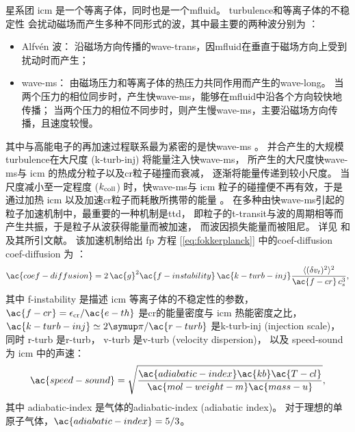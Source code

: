 星系团 \ac{icm} 是一个等离子体，同时也是一个\ac{mfluid}。
\ac{turbulence}和等离子体的不稳定性 \cite{schekochihin2005}
会扰动磁场而产生多种不同形式的波，其中最主要的两种波分别为 \cite{cho2003}：
\begin{itemize}
  \item Alfvén 波：
    沿磁场方向传播的\ac{wave-trans}，因\ac{mfluid}在垂直于磁场方向上受到扰动时而产生；
  \item \ac{wave-ms}：
    由磁场压力和等离子体的热压力共同作用而产生的\ac{wave-long}。
    当两个压力的相位同步时，产生快\ac{wave-ms}，能够在\ac{mfluid}中沿各个方向较快地传播；
    当两个压力的相位不同步时，则产生慢\ac{wave-ms}，主要沿磁场方向传播，且速度较慢。
\end{itemize}
其中与高能电子的再加速过程联系最为紧密的是快\ac{wave-ms}
\cite{brunetti2007,brunetti2011mhd}。
并合产生的大规模\ac{turbulence}在大尺度 (\ac{k-turb-inj}) 将能量注入快\ac{wave-ms}，
所产生的大尺度快\ac{wave-ms}与 \ac{icm} 的热成分粒子以及\ac{cr}粒子碰撞而衰减，
逐渐将能量传递到较小尺度。
当尺度减小至一定程度 ($k_{\mathrm{coll}}$) 时，快\ac{wave-ms}与 \ac{icm}
粒子的碰撞便不再有效，于是通过加热 \ac{icm} 以及加速\ac{cr}粒子而耗散所携带的能量
\cite{brunetti2007,brunetti2011}。
在多种由快\ac{wave-ms}引起的粒子加速机制中，最重要的一种机制是\ac{ttd}，
即粒子的\ac{t-transit}与波的周期相等而产生共振，于是粒子从波获得能量而被加速，
而波因损失能量而被阻尼。
详见  和  及其所引文献。
该加速机制给出 \ac{fp} 方程 [\autoref{eq:fokkerplanck}]
中的\acl{coef-diffusion} \ac{coef-diffusion} 为
\cite{miniati2015,pinzke2017}：
\begin{equation}
  \label{eq:coef-diffusion}
  \ac{coef-diffusion}
    = 2\,\ac{g}^2 \ac{f-instability} \,\ac{k-turb-inj}
      \frac{\langle (\delta v_t)^2 \rangle^2}{\ac{f-cr} \, c_s^3} ,
\end{equation}
其中
\ac{f-instability} 是描述 \ac{icm} 等离子体的不稳定性的参数，
$\ac{f-cr} = \epsilon_{\R{cr}} / \ac{e-th}$
是\ac{cr}的能量密度与 \ac{icm} 热能密度之比，
$\ac{k-turb-inj} \simeq 2\Cpi / \ac{r-turb}$
是\acl{k-turb-inj} (injection scale)，
同时 \ac{r-turb} 是\acl{r-turb}，
\ac{v-turb} 是\acl{v-turb} (velocity dispersion)，
以及 \ac{speed-sound} 为 \ac{icm} 中的声速：
\begin{equation}
  \ac{speed-sound}
    = \sqrt{\frac{\ac{adiabatic-index} \ac{kb} \ac{T-cl}}{
        \ac{mol-weight-m} \ac{mass-u}}} ,
\end{equation}
其中 \ac{adiabatic-index} 是气体的\acl{adiabatic-index} (adiabatic index)。
对于理想的单原子气体，$\ac{adiabatic-index} = 5/3$。

